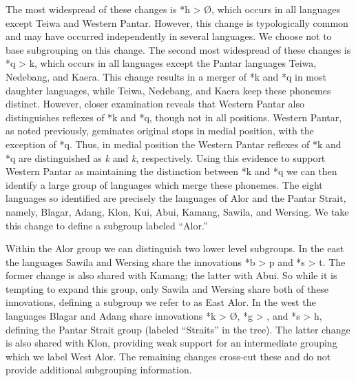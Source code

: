 The most widespread of these changes is *h {\textgreater} {\O}, which occurs in all languages except Teiwa and Western Pantar. However, this change is typologically common and may have occurred independently in several languages. We choose not to base subgrouping on this change. The second most widespread of these changes is *q {\textgreater} k, which occurs in all languages except the Pantar languages Teiwa, Nedebang, and Kaera. This change results in a merger of *k and *q in most daughter languages, while Teiwa, Nedebang, and Kaera keep these phonemes distinct. However, closer examination reveals that Western Pantar also distinguishes reflexes of *k and *q, though not in all positions. Western Pantar, as noted previously, geminates original stops in medial position, with the exception of *q. Thus, in medial position the Western Pantar reflexes of *k and *q are distinguished as \textit{k{\textlengthmark}} and \textit{k}, respectively. Using this evidence to support Western Pantar as maintaining the 
distinction between *k and *q we can then identify a large group of languages which merge these phonemes. The eight languages so identified are precisely the languages of Alor and the Pantar Strait, namely, Blagar, Adang, Klon, Kui, Abui, Kamang, Sawila, and Wersing. We take this change to define a subgroup labeled ``Alor.''

Within the Alor group we can distinguish two lower level subgroups. In the east the languages Sawila and Wersing share the innovations *b {\textgreater} p and *s {\textgreater} t. The former change is also shared with Kamang; the latter with Abui. So while it is tempting to expand this group, only Sawila and Wersing share both of these innovations, defining a subgroup we refer to as East Alor. In the west the languages Blagar and Adang share innovations *k {\textgreater} {\O}, *g {\textgreater} {\textglotstop}, and *s {\textgreater} h, defining the Pantar Strait group (labeled ``Straits'' in the tree). The latter change is also shared with Klon, providing weak support for an intermediate grouping which we label West Alor. The remaining changes cross-cut these and do not provide additional subgrouping information. 

